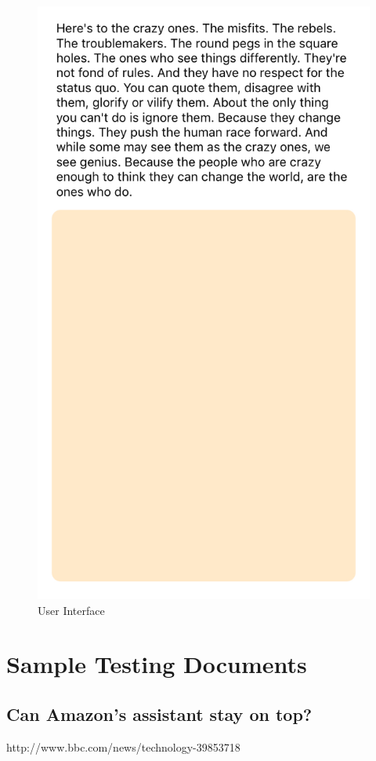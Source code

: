 \begin{figure}
	\centering
	\includegraphics[scale = 0.2]{ui}
	\caption{User Interface}
	\label{uipicture}
\end{figure}

\section{Sample Testing Documents}
\subsection{Can Amazon's assistant stay on top?}
http://www.bbc.com/news/technology-39853718
